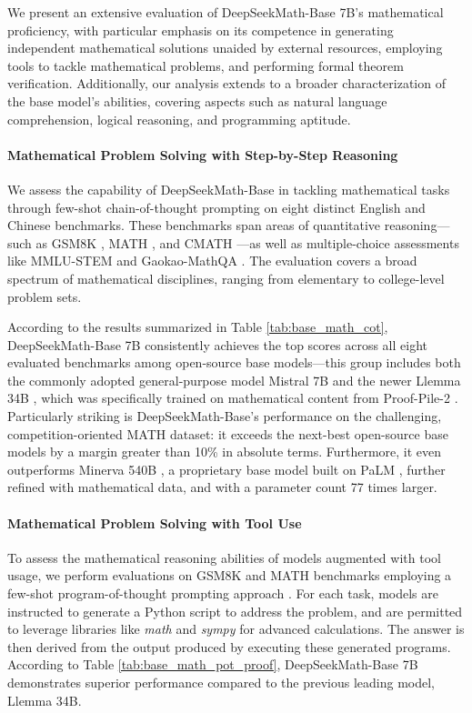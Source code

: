 \begin{itemize}[topsep=0pt]
We present an extensive evaluation of DeepSeekMath-Base 7B’s mathematical proficiency, with particular emphasis on its competence in generating independent mathematical solutions unaided by external resources, employing tools to tackle mathematical problems, and performing formal theorem verification. Additionally, our analysis extends to a broader characterization of the base model’s abilities, covering aspects such as natural language comprehension, logical reasoning, and programming aptitude.

\paragraph{Mathematical Problem Solving with Step-by-Step Reasoning}

We assess the capability of DeepSeekMath-Base in tackling mathematical tasks through few-shot chain-of-thought prompting \citep{cot} on eight distinct English and Chinese benchmarks. These benchmarks span areas of quantitative reasoning—such as GSM8K \citep{gsm8k}, MATH \citep{MATH}, and CMATH \citep{wei2023cmath}—as well as multiple-choice assessments like MMLU-STEM \citep{mmlu} and Gaokao-MathQA \citep{agieval}. The evaluation covers a broad spectrum of mathematical disciplines, ranging from elementary to college-level problem sets.

According to the results summarized in Table \ref{tab:base_math_cot}, DeepSeekMath-Base 7B consistently achieves the top scores across all eight evaluated benchmarks among open-source base models—this group includes both the commonly adopted general-purpose model Mistral 7B \citep{mistral} and the newer Llemma 34B \citep{llemma}, which was specifically trained on mathematical content from Proof-Pile-2 \citep{llemma}. Particularly striking is DeepSeekMath-Base’s performance on the challenging, competition-oriented MATH dataset: it exceeds the next-best open-source base models by a margin greater than 10\% in absolute terms. Furthermore, it even outperforms Minerva 540B \citep{minerva}, a proprietary base model built on PaLM \citep{palm}, further refined with mathematical data, and with a parameter count 77 times larger.

\paragraph{Mathematical Problem Solving with Tool Use} To assess the mathematical reasoning abilities of models augmented with tool usage, we perform evaluations on GSM8K and MATH benchmarks employing a few-shot program-of-thought prompting approach \citep{pot,pal}. For each task, models are instructed to generate a Python script to address the problem, and are permitted to leverage libraries like \textit{math} and \textit{sympy} for advanced calculations. The answer is then derived from the output produced by executing these generated programs. According to Table \ref{tab:base_math_pot_proof}, DeepSeekMath-Base 7B demonstrates superior performance compared to the previous leading model, Llemma 34B.


\end{itemize}
